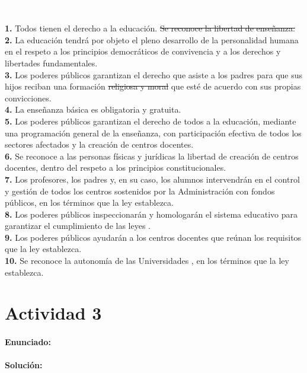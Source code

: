 \textcolor{white}{a}\\\\
\textbf{1.
} Todos tienen el derecho a la educación.
 \sout{Se reconoce la libertad de enseñanza.
}\\
\textbf{2.
} La educación tendrá por objeto el pleno desarrollo de la personalidad humana en el respeto a los principios democráticos de convivencia y a los derechos y libertades fundamentales.
 \\
\textbf{3.
} Los poderes públicos garantizan el derecho que asiste a los padres para que sus hijos reciban una formación \sout{religiosa y moral} que esté de acuerdo con sus propias convicciones.
 \\
\textbf{4.
} La enseñanza básica es obligatoria y gratuita.
\\
\textbf{5.
} Los poderes públicos garantizan el derecho de todos a la educación, mediante una programación general de la enseñanza, con participación efectiva de todos los sectores afectados y la creación de centros docentes.
 \\
\textbf{6.
} Se reconoce a las personas físicas y jurídicas la libertad de creación de centros docentes, dentro del respeto a los principios constitucionales.
 \\
\textbf{7.
} Los profesores, los padres y, en su caso, los alumnos intervendrán en el control y gestión de todos los centros sostenidos por la Administración con fondos públicos, en los términos que la ley establezca.
\\
\textbf{8.
} Los poderes públicos inspeccionarán y homologarán el sistema educativo para garantizar el cumplimiento de las leyes .
 \\
\textbf{9.
} Los poderes públicos ayudarán a los centros docentes que reúnan los requisitos que la ley establezca.
\\
\textbf{10.
} Se reconoce la autonomía de las Universidades , en los términos que la ley establezca.
\\


\newpage
\section*{Actividad 3}
\paragraph{Enunciado: }

\paragraph{Solución: }

